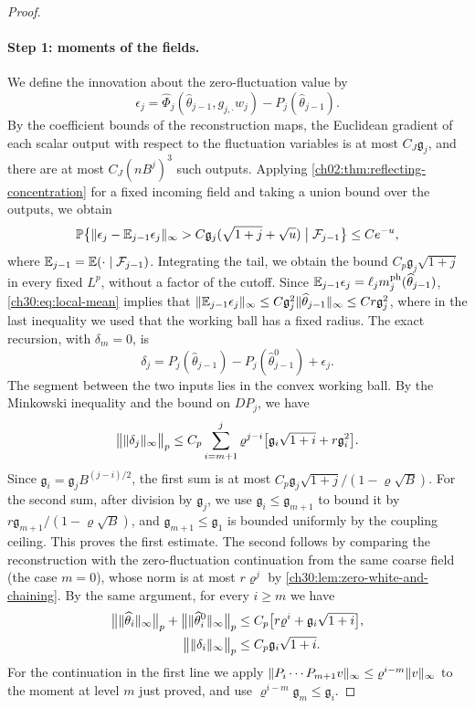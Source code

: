 \begin{proof}
\paragraph{Step 1: moments of the fields.} We define the innovation about the zero-fluctuation value by
\[
 \epsilon_j=\widehat\Phi_j(\widehat\theta_{j-1},g_{j,\cdot}w_j)-P_j(\widehat\theta_{j-1}).
\]
By the coefficient bounds of the reconstruction maps, the Euclidean gradient of each scalar output with respect to the fluctuation variables is at most $C_J\mathfrak g_j$, and there are at most $C_J(nB^j)^3$ such outputs. Applying \cref{ch02:thm:reflecting-concentration} for a fixed incoming field and taking a union bound over the outputs, we obtain
\[
 \mathbb P\bigl\{\lVert \epsilon_j-\mathbb E_{j-1}\epsilon_j\rVert_\infty>C\mathfrak g_j(\sqrt{1+j}+\sqrt u)\bigm|\mathcal F_{j-1}\bigr\}\le Ce^{-u},
\]
where $\mathbb E_{j-1}=\mathbb E(\cdot\mid\mathcal F_{j-1})$. Integrating the tail, we obtain the bound $C_p\mathfrak g_j\sqrt{1+j}$ in every fixed $L^p$, without a factor of the cutoff. Since $\mathbb E_{j-1}\epsilon_j=\ell_jm_j^{\mathrm{ph}}(\widehat\theta_{j-1})$, \eqref{ch30:eq:local-mean} implies that $\lVert \mathbb E_{j-1}\epsilon_j\rVert_\infty\le C\mathfrak g_j^2\lVert \widehat\theta_{j-1}\rVert_\infty\le Cr\mathfrak g_j^2$, where in the last inequality we used that the working ball has a fixed radius. The exact recursion, with $\delta_m=0$, is
\[
 \delta_j=P_j(\widehat\theta_{j-1})-P_j(\widehat\theta_{j-1}^0)+\epsilon_j .
\]
The segment between the two inputs lies in the convex working ball. By the Minkowski inequality and the bound on $DP_j$, we have
\[
 \bigl\lVert\lVert \delta_j\rVert_\infty\bigr\rVert_p\le C_p\sum_{i=m+1}^j\varrho^{j-i}\bigl[\mathfrak g_i\sqrt{1+i}+r\mathfrak g_i^2\bigr].
\]
Since $\mathfrak g_i=\mathfrak g_jB^{(j-i)/2}$, the first sum is at most $C_p\mathfrak g_j\sqrt{1+j}/(1-\varrho\sqrt B)$. For the second sum, after division by $\mathfrak g_j$, we use $\mathfrak g_i\le\mathfrak g_{m+1}$ to bound it by $r\mathfrak g_{m+1}/(1-\varrho\sqrt B)$, and $\mathfrak g_{m+1}\le\mathfrak g_1$ is bounded uniformly by the coupling ceiling. This proves the first estimate. The second follows by comparing the reconstruction with the zero-fluctuation continuation from the same coarse field (the case $m=0$), whose norm is at most $r\varrho^j$ by \cref{ch30:lem:zero-white-and-chaining}. By the same argument, for every $i\ge m$ we have
\begin{equation}\label{ch30:eq:paired-field-moments}
 \begin{split}
 \bigl\lVert\lVert \widehat\theta_i\rVert_\infty\bigr\rVert_p+\bigl\lVert\lVert \widehat\theta_i^0\rVert_\infty\bigr\rVert_p&\le C_p\bigl[r\varrho^i+\mathfrak g_i\sqrt{1+i}\bigr],\\
 \bigl\lVert\lVert \delta_i\rVert_\infty\bigr\rVert_p&\le C_p\mathfrak g_i\sqrt{1+i}.
 \end{split}
\end{equation}
For the continuation in the first line we apply $\lVert P_i\cdots P_{m+1}v\rVert_\infty\le\varrho^{i-m}\lVert v\rVert_\infty$ to the moment at level $m$ just proved, and use $\varrho^{i-m}\mathfrak g_m\le\mathfrak g_i$.


\end{proof}
